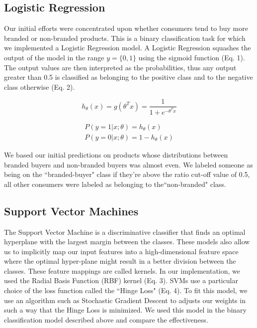 \documentclass[conference]{IEEEtran}
\begin{document}
\subsection{Logistic Regression}
Our initial efforts were concentrated upon whether consumers tend to buy more branded or non-branded products. This is a binary classification task for which we implemented a Logistic Regression model. A Logistic Regression squashes the output of the model in the range $y = \{0,1\} $  using the sigmoid function (Eq. 1). The output values are then interpreted as the probabilities, thus any output greater than 0.5 is classified as belonging to the positive class and to the negative class otherwise (Eq. 2).

\begin{equation}
h_\theta(x) = g(\theta^Tx) =  \frac{1}{1 + e^{-\theta^Tx}}
\end{equation}

\begin{equation}
\begin{aligned}
P(y = 1 | x;\theta) = h_\theta(x) \\
P(y = 0 | x;\theta) = 1 - h_\theta(x)
\end{aligned}
\end{equation}

We based our initial predictions on products whose distributions between branded buyers and non-branded buyers was almost even. We labeled someone as being on the ``branded-buyer" class if they're above the ratio cut-off value of 0.5, all other consumers were labeled as belonging to the``non-branded" class. 

\subsection{Support Vector Machines}
The Support Vector Machine is a discriminative classifier that finds an optimal hyperplane  with the largest margin between the classes. These models also allow us to implicitly map our input features into a high-dimensional feature space where the optimal hyper-plane might result in a better division between the classes. These feature mappings are called kernels. In our implementation, we used the Radial Basis Function (RBF) kernel (Eq. 3). SVMs use a particular choice of the loss function called the ``Hinge Loss" (Eq. 4). To fit this model, we use an algorithm such as Stochastic Gradient Descent to adjusts our weights in such a way that the Hinge Loss is minimized. We used this model in the binary classification model described above and compare the effectiveness.
\end{document}
